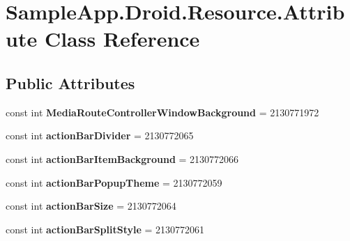 \hypertarget{class_sample_app_1_1_droid_1_1_resource_1_1_attribute}{}\section{Sample\+App.\+Droid.\+Resource.\+Attribute Class Reference}
\label{class_sample_app_1_1_droid_1_1_resource_1_1_attribute}
\subsection*{Public Attributes}
\begin{DoxyCompactItemize}
\item 
\mbox{\label{class_sample_app_1_1_droid_1_1_resource_1_1_attribute_aaea8864e63041d9e4b35837d9670bace}} 
const int {\bfseries Media\+Route\+Controller\+Window\+Background} = 2130771972
\item 
\mbox{\label{class_sample_app_1_1_droid_1_1_resource_1_1_attribute_a2ce668a20f0451fb1dec73b2c5e1cc75}} 
const int {\bfseries action\+Bar\+Divider} = 2130772065
\item 
\mbox{\label{class_sample_app_1_1_droid_1_1_resource_1_1_attribute_a3518a26ded3207434afece377d7b758d}} 
const int {\bfseries action\+Bar\+Item\+Background} = 2130772066
\item 
\mbox{\label{class_sample_app_1_1_droid_1_1_resource_1_1_attribute_ab604c3e931fca0a67341e8f69e32c00c}} 
const int {\bfseries action\+Bar\+Popup\+Theme} = 2130772059
\item 
\mbox{\label{class_sample_app_1_1_droid_1_1_resource_1_1_attribute_a9d168716db8f735435b7b4e450d9a68f}} 
const int {\bfseries action\+Bar\+Size} = 2130772064
\item 
\mbox{\label{class_sample_app_1_1_droid_1_1_resource_1_1_attribute_a06a7865c3d2271d5305e00bd315b045d}} 
const int {\bfseries action\+Bar\+Split\+Style} = 2130772061

\end{DoxyCompactItemize}
